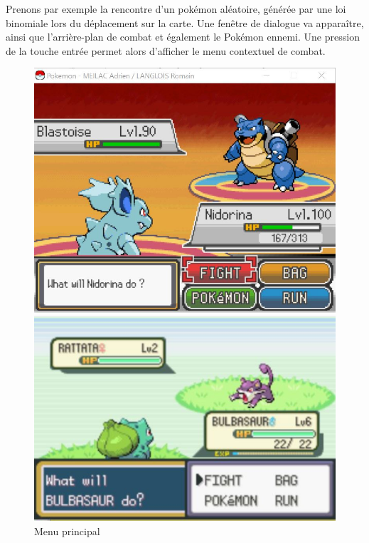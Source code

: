 Prenons par exemple la rencontre d'un pokémon aléatoire, générée par une loi binomiale lors du déplacement sur la carte. Une fenêtre de dialogue va apparaître, ainsi que l'arrière-plan de combat et également le Pokémon ennemi. Une pression de la touche entrée permet alors d'afficher le menu contextuel de combat.

\begin{figure}[!h]
\begin{minipage}{0.49\textwidth}
\includegraphics[scale = 0.6]{../Images/mainMenu.jpg}
\end{minipage}
\begin{minipage}{0.49\textwidth}
\includegraphics[scale = 0.84]{../Images/vrai_jeu_mainMenu.jpg}
\end{minipage}
\caption{Menu principal}
\end{figure}



